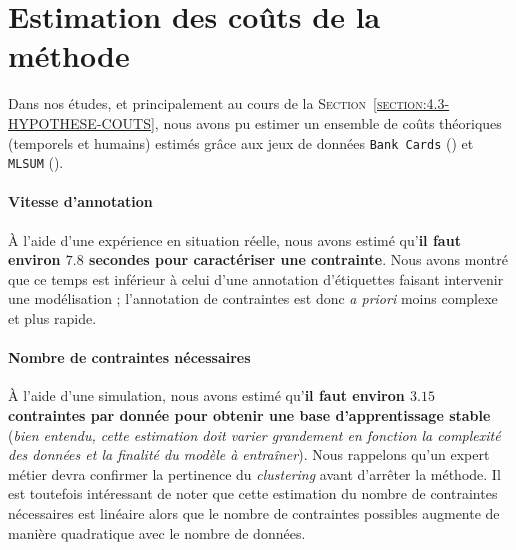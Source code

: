 	
	\newpage
	\section{Estimation des coûts de la méthode}
	\label{section:5.5-GUIDE-COUTS}
	
		Dans nos études, et principalement au cours de la \textsc{Section~\ref{section:4.3-HYPOTHESE-COUTS}}, nous avons pu estimer un ensemble de coûts théoriques (temporels et humains) estimés grâce aux jeux de données \texttt{Bank Cards} (\cite{schild:2022:french-trainset-chatbots}) et \texttt{MLSUM} (\cite{schild-adler:2023:subset-mlsum-multilingual}).
		
		
		\paragraph{\textcolor{colorSilverLakeBlue}{\faCheckSquare} Vitesse d'annotation}
			
			À l'aide d'une expérience en situation réelle, nous avons estimé qu'\textbf{il faut environ $7.8$ secondes pour caractériser une contrainte}.
			Nous avons montré que ce temps est inférieur à celui d'une annotation d'étiquettes faisant intervenir une modélisation ;
			l'annotation de contraintes est donc \textit{a priori} moins complexe et plus rapide.
		
		
		\paragraph{\textcolor{colorSilverLakeBlue}{\faCheckSquare} Nombre de contraintes nécessaires}
		
			À l'aide d'une simulation, nous avons estimé qu'\textbf{il faut environ $3.15$ contraintes par donnée pour obtenir une base d'apprentissage stable} (\textit{bien entendu, cette estimation doit varier grandement en fonction la complexité des données et la finalité du modèle à entraîner}).
			Nous rappelons qu'un expert métier devra confirmer la pertinence du \textit{clustering} avant d'arrêter la méthode.
			Il est toutefois intéressant de noter que cette estimation du nombre de contraintes nécessaires est linéaire alors que le nombre de contraintes possibles augmente de manière quadratique avec le nombre de données.
		
